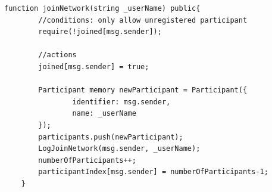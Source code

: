 \begin{lstlisting}[language=Solidity, label=contractsecurity, caption=Function to Join Network] 
	function joinNetwork(string _userName) public{
		//conditions: only allow unregistered participant
		require(!joined[msg.sender]);

		//actions
		joined[msg.sender] = true;
		
		Participant memory newParticipant = Participant({
				identifier: msg.sender,
				name: _userName
        });
		participants.push(newParticipant);
        LogJoinNetwork(msg.sender, _userName);
        numberOfParticipants++;
        participantIndex[msg.sender] = numberOfParticipants-1;
    }
\end{lstlisting}



